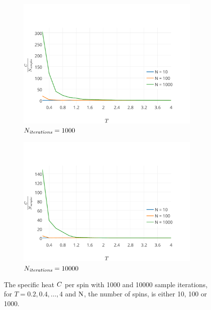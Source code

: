 	\begin{figure}
		\centering
		\begin{subfigure}{\columnwidth}
			\centering
			\includegraphics[width=\textwidth, keepaspectratio=true]{img/1D/1DspecificHeatN1000.pdf}
			\caption{$N_\textit{iterations} = 1000$}
			\label{fig:results:1D:C:1000}
		\end{subfigure}
		\begin{subfigure}{\columnwidth}
			\centering
			\includegraphics[width=\textwidth, keepaspectratio=true]{img/1D/1DspecificHeatN10000.pdf}
			\caption{$N_\textit{iterations} = 10000$}
			\label{fig:results:1D:C:10000}
		\end{subfigure}	
		\caption{The specific heat $C$ per spin with  1000 and  10000 sample iterations, for $T = 0.2, 0.4, \dotsc, 4$ and $\mathrm{N}$, the number of spins, is either 10, 100 or 1000.}
		\label{fig:results:1D:C}
	\end{figure}

